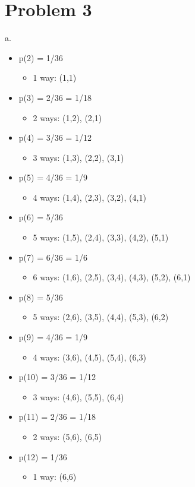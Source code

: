 \documentclass[a4paper]{article}
\begin{document}
\section{Problem 3}
a.
\begin{itemize}
    \item p(2) = 1/36
    \begin{itemize}
        \item 1 way: (1,1)
    \end{itemize}
    \item p(3) = 2/36 = 1/18
    \begin{itemize}
        \item 2 ways: (1,2), (2,1)
    \end{itemize}
    \item p(4) = 3/36 = 1/12
    \begin{itemize}
        \item 3 ways: (1,3), (2,2), (3,1)
    \end{itemize}    
    \item p(5) = 4/36 = 1/9
    \begin{itemize}
        \item 4 ways: (1,4), (2,3), (3,2), (4,1)
    \end{itemize}   
    \item p(6) = 5/36
    \begin{itemize}
        \item 5 ways: (1,5), (2,4), (3,3), (4,2), (5,1)
    \end{itemize} 
    \item p(7) = 6/36 = 1/6
    \begin{itemize}
        \item 6 ways: (1,6), (2,5), (3,4), (4,3), (5,2), (6,1)
    \end{itemize} 
    \item p(8) = 5/36
    \begin{itemize}
        \item 5 ways: (2,6), (3,5), (4,4), (5,3), (6,2)
    \end{itemize} 
    \item p(9) = 4/36 = 1/9
    \begin{itemize}
        \item 4 ways: (3,6), (4,5), (5,4), (6,3)
    \end{itemize}   
    \item p(10) = 3/36 = 1/12
    \begin{itemize}
        \item 3 ways: (4,6), (5,5), (6,4)
    \end{itemize} 
    \item p(11) = 2/36 = 1/18
    \begin{itemize}
        \item 2 ways: (5,6), (6,5)
    \end{itemize}
    \item p(12) = 1/36
    \begin{itemize}
        \item 1 way: (6,6)
    \end{itemize}
\end{itemize}
\end{document}
